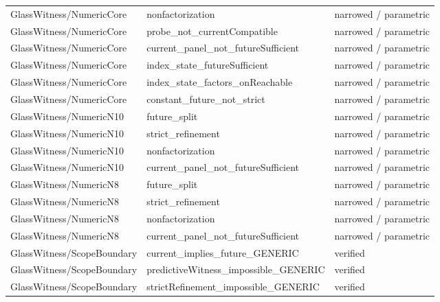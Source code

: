 \begin{longtable}{>{\raggedright\arraybackslash}p{3.6cm}>{\raggedright\arraybackslash}p{8.4cm}p{2.9cm}}
GlassWitness/\allowbreak{}NumericCore & nonfactorization & narrowed / parametric \\
GlassWitness/\allowbreak{}NumericCore & probe\_\allowbreak{}not\_\allowbreak{}currentCompatible & narrowed / parametric \\
GlassWitness/\allowbreak{}NumericCore & current\_\allowbreak{}panel\_\allowbreak{}not\_\allowbreak{}futureSufficient & narrowed / parametric \\
GlassWitness/\allowbreak{}NumericCore & index\_\allowbreak{}state\_\allowbreak{}futureSufficient & narrowed / parametric \\
GlassWitness/\allowbreak{}NumericCore & index\_\allowbreak{}state\_\allowbreak{}factors\_\allowbreak{}onReachable & narrowed / parametric \\
GlassWitness/\allowbreak{}NumericCore & constant\_\allowbreak{}future\_\allowbreak{}not\_\allowbreak{}strict & narrowed / parametric \\
GlassWitness/\allowbreak{}NumericN10 & future\_\allowbreak{}split & narrowed / parametric \\
GlassWitness/\allowbreak{}NumericN10 & strict\_\allowbreak{}refinement & narrowed / parametric \\
GlassWitness/\allowbreak{}NumericN10 & nonfactorization & narrowed / parametric \\
GlassWitness/\allowbreak{}NumericN10 & current\_\allowbreak{}panel\_\allowbreak{}not\_\allowbreak{}futureSufficient & narrowed / parametric \\
GlassWitness/\allowbreak{}NumericN8 & future\_\allowbreak{}split & narrowed / parametric \\
GlassWitness/\allowbreak{}NumericN8 & strict\_\allowbreak{}refinement & narrowed / parametric \\
GlassWitness/\allowbreak{}NumericN8 & nonfactorization & narrowed / parametric \\
GlassWitness/\allowbreak{}NumericN8 & current\_\allowbreak{}panel\_\allowbreak{}not\_\allowbreak{}futureSufficient & narrowed / parametric \\
GlassWitness/\allowbreak{}ScopeBoundary & current\_\allowbreak{}implies\_\allowbreak{}future\_\allowbreak{}GENERIC & verified \\
GlassWitness/\allowbreak{}ScopeBoundary & predictiveWitness\_\allowbreak{}impossible\_\allowbreak{}GENERIC & verified \\
GlassWitness/\allowbreak{}ScopeBoundary & strictRefinement\_\allowbreak{}impossible\_\allowbreak{}GENERIC & verified \\

\end{longtable}
